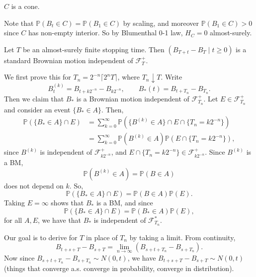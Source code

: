 \documentclass[12pt]{article}
\begin{document}
\begin{remark}
	$C$ is a cone.
\end{remark}

\begin{proofbox}
	Note that $\mathbb{P}(B_t \in C) = \mathbb{P}(B_1 \in C)$ by scaling, and moreover $\mathbb{P}(B_1 \in C) > 0$ since $C$ has non-empty interior. So by Blumenthal 0-1 law, $H_C = 0$ almost-surely.
\end{proofbox}

\begin{theorem}
	Let $T$ be an almost-surely finite stopping time. Then $(B_{T+t} - B_T \mid t \geq 0)$ is a standard Brownian motion independent of $\mathcal{F}_T^{+}$.
\end{theorem}

\begin{proofbox}
	We first prove this for $T_n = 2^{-n} \lceil 2^{n} T \rceil$, where $T_n \downarrow T$. Write
	\[
	B_t^{(k)} = B_{t + k2^{-n}} - B_{k 2^{-n}}, \qquad B_\ast(t) = B_{t + T_n} - B_{T_n}.
	\]
	Then we claim that $B_\ast$ is a Brownian motion independent of $\mathcal{F}_{T_n}^{+}$. Let $E \in \mathcal{F}_{T_n}^+$ and consider an event $\{B_\ast \in A\}$. Then,
	\begin{align*}
		\mathbb{P}(\{B_\ast \in A\} \cap E) &= \sum_{k = 0}^\infty \mathbb{P}(\{B^{(k)} \in A\} \cap E \cap \{T_n = k 2^{-n}\}) \\
						    &= \sum_{k = 0}^{\infty} \mathbb{P}(B^{(k)} \in A) \mathbb{P}(E \cap \{T_n = k 2^{-n}\}),
	\end{align*}
	since $B^{(k)}$ is independent of $\mathcal{F}_{k 2^{-n}}^+$, and $E \cap \{T_n = k 2^{-n}\} \in \mathcal{F}_{k2^{-n}}^+$. Since $B^{(k)}$ is a BM,
	\[
	\mathbb{P}(B^{(k)} \in A) = \mathbb{P}(B \in A)
	\]
	does not depend on $k$. So,
	\[
		\mathbb{P}(\{B_\ast \in A\} \cap E) = \mathbb{P}(B \in A) \mathbb{P}(E).
	\]
	Taking $E = \infty$ shows that $B_\ast$ is a BM, and since
	\[
		\mathbb{P}(\{B_\ast \in A\} \cap E) = \mathbb{P}(B_\ast \in A) \mathbb{P}(E),
	\]
	for all $A, E$, we have that $B_\ast$ is independent of $\mathcal{F}_{T_n}^{\ast}$.

	Our goal is to derive for $T$ in place of $T_n$ by taking a limit. From continuity,
	\[
	B_{t + s + T} - B_{s + T} = \lim_{n \to \infty} (B_{s + t + T_n} - B_{s + T_n}).
	\]
	Now since $B_{s + t + T_n} - B_{s + T_n} \sim N(0, t)$, we have $B_{t + s + T} - B_{s + T} \sim N(0, t)$ (things that converge a.s. converge in probability, converge in distribution).


\end{proofbox}
\end{document}
